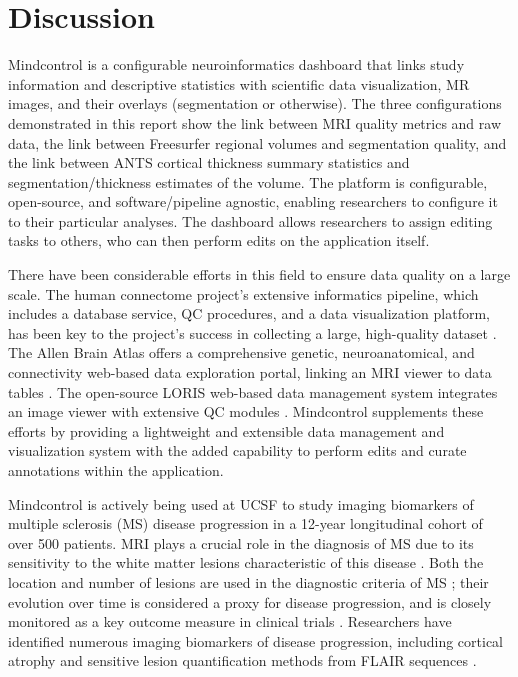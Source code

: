 \section{Discussion}

Mindcontrol is a configurable neuroinformatics dashboard that links study information and descriptive statistics with scientific data visualization, MR images, and their overlays (segmentation or otherwise). The three configurations demonstrated in this report show the link between MRI quality metrics and raw data, the link between Freesurfer regional volumes and segmentation quality, and the link between ANTS cortical thickness summary statistics and segmentation/thickness estimates of the volume. The platform is configurable, open-source, and software/pipeline agnostic, enabling researchers to configure it to their particular analyses. The dashboard allows researchers to assign editing tasks to others, who can then perform edits on the application itself. 

There have been considerable efforts in this field to ensure data quality on a large scale. The human connectome project's extensive informatics pipeline, which includes a database service, QC procedures, and a data visualization platform, has been key to the project's success in collecting a large, high-quality dataset \cite{Marcus_2013}. The Allen Brain Atlas offers a comprehensive genetic, neuroanatomical, and connectivity web-based data exploration portal, linking an MRI viewer to data tables \cite{Sunkin_2012}. The open-source LORIS web-based data management system integrates an image viewer with extensive QC modules \cite{Das_2012}. Mindcontrol supplements these efforts by providing a lightweight and extensible data management and visualization system with the added capability to perform edits and curate annotations within the application. 

Mindcontrol is actively being used at UCSF to study imaging biomarkers of multiple sclerosis (MS) disease progression in a 12-year longitudinal cohort of over 500 patients. MRI plays a crucial role in the diagnosis of MS due to its sensitivity to the white matter lesions characteristic of this disease \cite{ge2006multiple}. Both the location and number of lesions are used in the diagnostic criteria of MS \cite{mcdonald2001recommended}; their evolution over time is considered a proxy for disease progression, and is closely monitored as a key outcome measure in clinical trials \cite{ge2000glatiramer}. Researchers have identified numerous imaging biomarkers of disease progression, including cortical atrophy \cite{fisher2008gray} and sensitive lesion quantification methods from FLAIR sequences \cite{Schmidt_2012}. 

